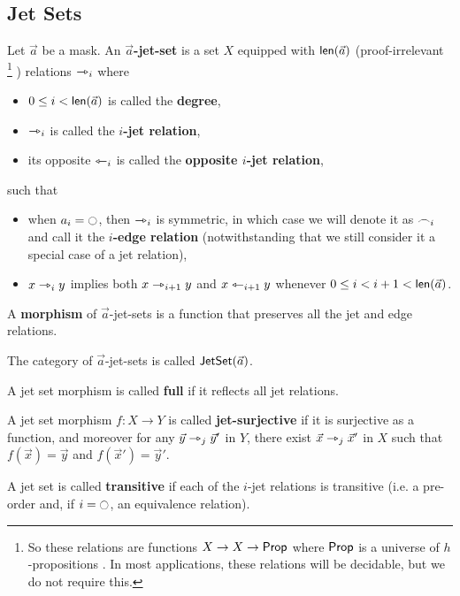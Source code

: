 \documentclass[a4paper]{memoir}
\begin{document}
\subsection{Jet Sets}
\begin{definition} \label{def:jetset}
	Let $\vec a$ be a mask. An \textbf{$\vec a$-jet-set} is a set $X$ equipped with $\mathsf{len}(\vec a)$ (proof-irrelevant%
	\footnote{So these relations are functions $X \to X \to {\mathsf{Prop}}$ where ${\mathsf{Prop}}$ is a universe of $h$-propositions \cite{hottbook}. In most applications, these relations will be decidable, but we do not require this.}%
	) relations $\rightarrowtriangle_i$ where
	\begin{itemize}
		\item $0 \leq i < \mathsf{len}(\vec a)$ is called the \textbf{degree},
		\item $\rightarrowtriangle_i$ is called the \textbf{$i$-jet relation},
		\item its opposite $\leftarrowtriangle_i$ is called the \textbf{opposite $i$-jet relation},
	\end{itemize}
	such that
	\begin{itemize}
		\item when $a_i = \npolar$, then $\rightarrowtriangle_i$ is symmetric, in which case we will denote it as $\frown_i$ and call it the \textbf{$i$-edge relation} (notwithstanding that we still consider it a special case of a jet relation),
		\item $x \rightarrowtriangle_i y$ implies both $x \rightarrowtriangle_{i+1} y$ and $x \leftarrowtriangle_{i+1} y$ whenever $0 \leq i < i+1 < \mathsf{len}(\vec a)$.
	\end{itemize}
	A \textbf{morphism} of $\vec a$-jet-sets is a function that preserves all the jet and edge relations.
	
	The category of $\vec a$-jet-sets is called $\mathsf{JetSet}(\vec a)$.
\end{definition}
\begin{definition} \label{def:full-jetsethom}
	A jet set morphism is called \textbf{full} if it reflects all jet relations.
\end{definition}
\begin{definition} \label{def:jet-surjective}
	A jet set morphism $f : X \to Y$ is called \textbf{jet-surjective} if it is surjective as a function, and moreover for any $\vec y \rightarrowtriangle_j \vec y'$ in $Y$, there exist $\vec x \rightarrowtriangle_j \vec x'$ in $X$ such that $f(\vec x) = \vec y$ and $f(\vec x') = \vec y'$. 
\end{definition}
\begin{definition} \label{def:transitive-jetset}
	A jet set is called \textbf{transitive} if each of the $i$-jet relations is transitive (i.e. a pre-order and, if $i = \npolar$, an equivalence relation).
\end{definition}
\end{document}
